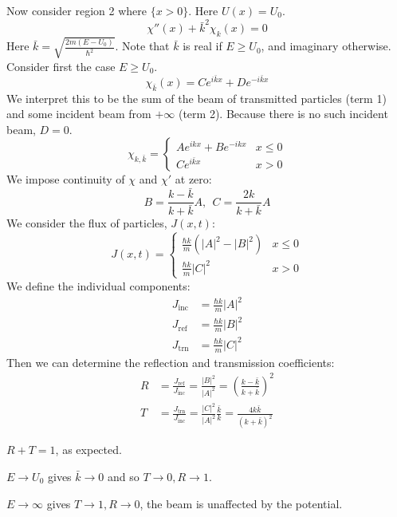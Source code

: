 \documentclass[../Main.tex]{subfiles}
\begin{document}
Now consider region 2 where $\{x > 0\}$. Here $U(x) = U_0$.
\begin{equation*}
    \chi''(x) + \bar{k}^2 \chi_k(x) = 0
\end{equation*}
Here $\bar{k} = \sqrt{\frac{2m(E-U_0)}{\hbar^2}}$. Note that $\bar{k}$ is real if $E \geq U_0$, and imaginary otherwise.
Consider first the case $E \geq U_0$.
\begin{equation*}
    \chi_{\bar{k}}(x) = Ce^{i\bar{k}x} + De^{-i\bar{k}x}
\end{equation*}
We interpret this to be the sum of the beam of transmitted particles (term 1) and some incident beam from $+\infty$ (term 2). Because there is no such incident beam, $D = 0$.
\begin{equation*}
    \chi_{k, \bar{k}} =
    \begin{cases}
        Ae^{ikx} + Be^{-ikx} & x \leq 0 \\
        Ce^{i\bar{k}x} & x > 0
    \end{cases}
\end{equation*}
We impose continuity of $\chi$ and $\chi'$ at zero:
\begin{equation*}
    B = \frac{k - \bar{k}}{k + \bar{k}} A,~~ C = \frac{2k}{k + \bar{k}}A
\end{equation*}
We consider the flux of particles, $J(x, t)$:
\begin{equation*}
    J(x, t) =
    \begin{cases}
        \frac{\hbar k}{m}\left(|A|^2 - |B|^2\right) & x \leq 0 \\
        \frac{\hbar k}{m}|C|^2 & x > 0
    \end{cases}
\end{equation*}
We define the individual components:
\begin{align*}
    J_{\text{inc}} &= \frac{\hbar k}{m} |A|^2 \\
    J_{\text{ref}} &= \frac{\hbar k}{m} |B|^2 \\
    J_{\text{trn}} &= \frac{\hbar k}{m} |C|^2
\end{align*}
Then we can determine the reflection and transmission coefficients:
\begin{align*}
    R &= \frac{J_{\text{ref}}}{J_\text{inc}} = \frac{|B|^2}{|A|^2} = \left(\frac{k - \bar{k}}{k + \bar{k}}\right)^2 \\
    T &= \frac{J_\text{trn}}{J_\text{inc}} = \frac{|C|^2}{|A|^2}\frac{\bar{k}}{k} = \frac{4k\bar{k}}{(k + \bar{k})^2}
\end{align*}
\begin{remarks}
    \item $R + T = 1$, as expected. 
    \item $E \to U_0$ gives $\bar{k} \to 0$ and so $T \to 0, R \to 1$.
    \item $E \to \infty$ gives $T \to 1, R \to 0$, the beam is unaffected by the potential.
\end{remarks}
\end{document}
